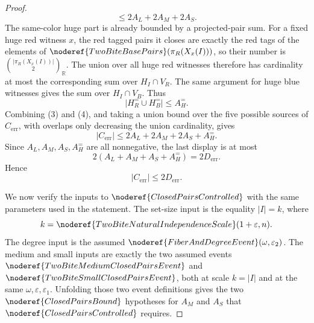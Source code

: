 \begin{proof}
\[\le 2A_L+2A_M+2A_S. \tag{3}
\]
The same-color huge part is already bounded by a projected-pair sum.  For a
fixed huge red witness \(x\), the red tagged pairs it closes are exactly the
red tags of the elements of
\(\noderef{TwoBiteBasePairs}(\pi_R(X_x(I)))\), so their number is
\(\binom{|\pi_R(X_x(I))|}{2}_{\mathbb R}\).  The union over all huge red
witnesses therefore has cardinality at most the corresponding sum over
\(H_I\cap V_R\).  The same argument for huge blue witnesses gives the sum over
\(H_I\cap V_B\).  Thus
\[
|H_R^{=} \cup H_B^{=}|\le A_H^{=}. \tag{4}
\]
Combining (3) and (4), and taking a union bound over the five possible sources
of \(C_{\mathrm{err}}\), with overlaps only decreasing the union cardinality,
gives
\[
|C_{\mathrm{err}}|
\le
2A_L+2A_M+2A_S+A_H^{=}.
\]
Since \(A_L,A_M,A_S,A_H^{=}\) are all nonnegative, the last display is at most
\[
2(A_L+A_M+A_S+A_H^{=})=2D_{\mathrm{err}}.
\]
Hence
\[
|C_{\mathrm{err}}|\le 2D_{\mathrm{err}}.
\]

We now verify the inputs to \(\noderef{ClosedPairsControlled}\) with the same
parameters used in the statement.  The set-size input is the equality
\(|I|=k\), where
\[
k=\noderef{TwoBiteNaturalIndependenceScale}(1+\varepsilon,n).
\]
The degree input is the assumed \(\noderef{FiberAndDegreeEvent}(\omega,\varepsilon_2)\).
The medium and small inputs are exactly the two assumed events
\(\noderef{TwoBiteMediumClosedPairsEvent}\) and
\(\noderef{TwoBiteSmallClosedPairsEvent}\), both at scale \(k=|I|\) and at the
same \(\omega,\varepsilon,\varepsilon_1\).  Unfolding those two event
definitions gives the two \(\noderef{ClosedPairsBound}\) hypotheses for
\(A_M\) and \(A_S\) that \(\noderef{ClosedPairsControlled}\) requires.


\end{proof}
